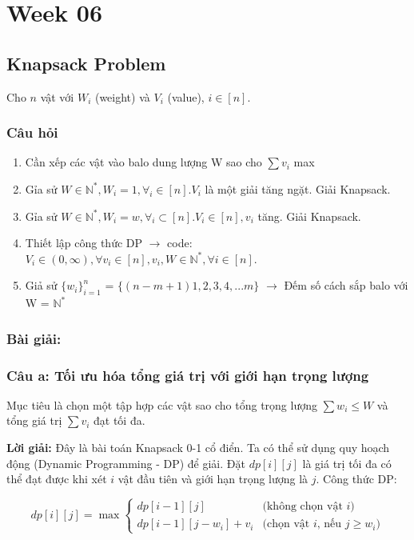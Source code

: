 \documentclass[a4paper,12pt]{article}
\begin{document}
\section*{Week 06}

\subsection*{Knapsack Problem}

Cho \( n \) vật với \( W_i \) (weight) và \( V_i \) (value), \( i \in [n] \).

\subsubsection*{Câu hỏi}
\begin{enumerate}
    \item Cần xếp các vật vào balo dung lượng W sao cho \( \sum v_i \) max
    \item Gỉa sử \( W \in \mathbb{N}^*, W_i = 1, \forall_i \in [n]. {V_i}\) là một giải tăng ngặt. Giải Knapsack.
    \item Gỉa sử \( W \in \mathbb{N}^*, W_i = w, \forall_i \subset [n]. {V_i} \in [n], {v_i}\) tăng. Giải Knapsack.
    \item Thiết lập công thức DP \(\to\) code: \( V_i \in (0, \infty), \forall v_i \in [n], v_i, W \in \mathbb{N}^*, \forall i \in [n] \).
    \item Giả sử \( \{ w_i \}_{i=1}^n \) = \( \{ (n-m+1) 1, 2, 3, 4,...m \}\) \(\to\) Đếm số cách sắp balo với W = \(\mathbb{N}^*\)
\end{enumerate}

\subsubsection*{Bài giải:}
\subsubsection*{Câu a: Tối ưu hóa tổng giá trị với giới hạn trọng lượng}
Mục tiêu là chọn một tập hợp các vật sao cho tổng trọng lượng \(\sum w_i \leq W\) và tổng giá trị \(\sum v_i\) đạt tối đa.

\textbf{Lời giải:} Đây là bài toán Knapsack 0-1 cổ điển. Ta có thể sử dụng quy hoạch động (Dynamic Programming - DP) để giải. Đặt \( dp[i][j] \) là giá trị tối đa có thể đạt được khi xét \( i \) vật đầu tiên và giới hạn trọng lượng là \( j \). Công thức DP:

\[
dp[i][j] = \max \begin{cases} 
dp[i-1][j] & \text{(không chọn vật } i\text{)} \\ 
dp[i-1][j-w_i] + v_i & \text{(chọn vật } i\text{, nếu } j \geq w_i\text{)}
\end{cases}
\]
\end{document}
